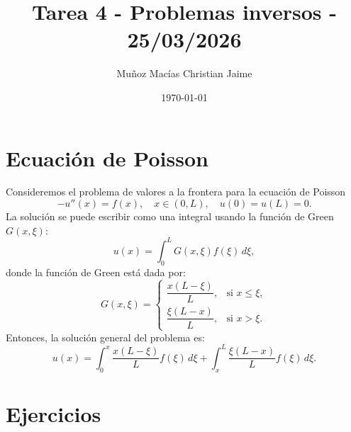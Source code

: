 \documentclass[12pt,spanish,mexico]{article}
\title{Tarea 4 - Problemas inversos - 25/03/2026}
\author{Muñoz Macías Christian Jaime}
\date{\today}
\numberwithin{equation}{section}
\theoremstyle{definition}
\theoremstyle{remark}
\begin{document}
\maketitle

\section*{Ecuación de Poisson}
Consideremos el problema de valores a la frontera para la ecuación de Poisson
\[
-u''(x) = f(x), \quad x \in (0, L), \quad u(0) = u(L) = 0. \tag{1}
\]
La solución se puede escribir como una integral usando la función de Green $G(x, \xi)$:
\[
u(x) = \int_{0}^{L} G(x, \xi) f(\xi) \, d\xi,
\]
donde la función de Green está dada por:
\[
G(x, \xi) = \begin{cases} 
\dfrac{x(L - \xi)}{L}, & \text{si } x \le \xi, \\[10pt]
\dfrac{\xi(L - x)}{L}, & \text{si } x > \xi. 
\end{cases}
\]
Entonces, la solución general del problema es:
\[
u(x) = \int_{0}^{x} \frac{x(L-\xi)}{L} f(\xi) \, d\xi + \int_{x}^{L} \frac{\xi(L-x)}{L} f(\xi) \, d\xi. \tag{2}
\]

\section*{Ejercicios}
\end{document}

